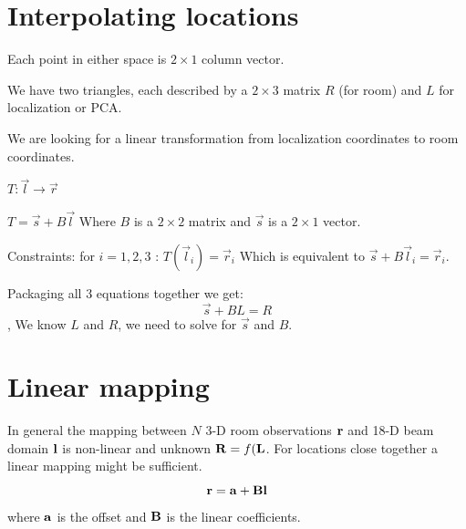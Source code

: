 \documentclass[journal]{IEEEtran}
\begin{document}


 
 





\section{Interpolating locations}

Each point in either space is $2 \times 1$ column vector.

We have two triangles, each described by a $2\times 3$ matrix $R$ (for room) and 
$L$ for localization or PCA.



We are looking for a linear transformation from localization coordinates to room coordinates.

$T: \vec{l} \to \vec{r}$

$T = \vec{s}+ B\vec{l}$ Where $B$ is a $2 \times 2$ matrix and $\vec{s}$ is a  $2 \times 1$ vector.

Constraints: for $i=1,2,3$ : $T(\vec{l}_i) = \vec{r}_i$
Which is equivalent to $\vec{s}+B \vec{l}_i = \vec{r}_i$.

Packaging all 3 equations together we get:
$$\vec{s} + B L = R$$, We know $L$ and $R$, we need to solve for $\vec{s}$ and $B$.

\section{Linear mapping}
In general the mapping between $N$ 3-D room observations $\bf r$ and 18-D beam domain $\bf l $ is non-linear and unknown ${\bf R}= f({\bf L}$. For locations close together a linear mapping might be sufficient. 
\begin{equation}
    {\bf r}= {\bf a}+ {\bf B}{\bf l}
\end{equation}
where ${\bf a}$ is the offset and ${\bf B}$ is the linear coefficients.
\end{document}

